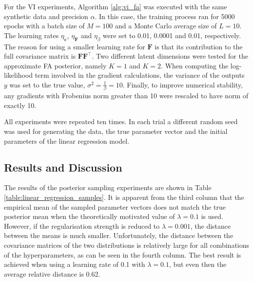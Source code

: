 \documentclass[msc,deptreport.inf]{infthesis} %
\newcommand{\matr}[1]{\mathbf{#1}}
\begin{document}
For the VI experiments, Algorithm \ref{alg:vi_fa} was executed with the same synthetic data and precision $\alpha$. In this case, the training process ran for 5000 epochs with a batch size of $M=100$ and a Monte Carlo average size of $L=10$.  The learning rates $\eta_\matr{c}$,  $\eta_\matr{F}$ and $\eta_\beta$ were set to 0.01, 0.0001 and 0.01, respectively. The reason for using a smaller learning rate for $\matr{F}$ is that its contribution to the full covariance matrix is $\matr{F}\matr{F}^\intercal$. Two different latent dimensions were tested for the approximate FA posterior, namely $K=1$ and $K=2$. When computing the log-likelihood term involved in the gradient calculations, the variance of the outputs $y$ was set to the true value, $\sigma^2 = \frac{1}{\beta} = 10$. Finally, to improve numerical stability, any gradients with Frobenius norm greater than 10 were rescaled to have norm of exactly 10. 

All experiments were repeated ten times. In each trial a different random seed was used for generating the data, the true parameter vector and the initial parameters of the linear regression model. 

\subsection{Results and Discussion}

The results of the posterior sampling experiments are shown in Table \ref{table:linear_regression_samples}. It is apparent from the third column that the empirical mean of the sampled parameter vectors does not match the true posterior mean when the theoretically motivated value of $\lambda = 0.1$ is used. However, if the regularisation strength is reduced to $\lambda = 0.001$, the distance between the means is much smaller. Unfortunately, the distance between the covariance matrices of the two distributions is relatively large for all combinations of the hyperparameters, as can be seen in the fourth column. The best result is achieved when using a learning rate of 0.1 with $\lambda = 0.1$, but even then the average relative distance is 0.62. 
\end{document}

